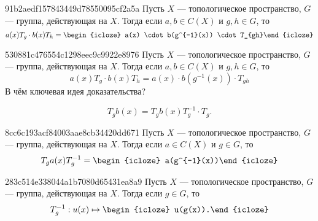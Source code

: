 \begin{note}{91b2aedf157843449d78550095cf2a5a}
    Пусть \({ X }\) --- топологическое пространство, \({ G }\) --- группа, действующая на \({ X }\).
    Тогда если \({ a, b \in C(X) }\) и \({ g, h \in G }\), то
    \[
        a(x)T_{g} \cdot b(x) T_{h} = \begin{icloze}{1}a(x) \cdot b(g^{-1}(x)) \cdot T_{gh}\end{icloze}
    \]
\end{note}

\begin{note}{530881c476554c1298eec9c9922e8976}
    Пусть \({ X }\) --- топологическое пространство, \({ G }\) --- группа, действующая на \({ X }\).
    Тогда если \({ a, b \in C(X) }\) и \({ g, h \in G }\), то
    \[
        a(x)T_{g} \cdot b(x) T_{h} = a(x) \cdot b(g^{-1}(x)) \cdot T_{gh}
    \]
    В чём ключевая идея доказательства?

    \begin{cloze}{1}
        \[
            T_{g} b(x) = T_{g} b(x) T_{g}^{-1} \cdot T_{g}.
        \]
    \end{cloze}
\end{note}

\begin{note}{8cc6c193acf84003aae8cb34420dd671}
    Пусть \({ X }\) --- топологическое пространство, \({ G }\) --- группа, действующая на \({ X }\).
    Тогда если \({ a \in C(X) }\) и \({ g \in G }\), то
    \[
        T_{g} a(x) T_{g}^{-1} = \begin{icloze}{1}a(g^{-1}(x))\end{icloze}
    \]
\end{note}

\begin{note}{283c514e338044a1b7080d65431ea8a9}
    Пусть \({ X }\) --- топологическое пространство, \({ G }\) --- группа, действующая на \({ X }\).
    Тогда если \({ g \in G }\), то
    \[
        T_{g}^{-1} : u(x) \mapsto \begin{icloze}{1}u(g(x)).\end{icloze}
    \]
\end{note}


